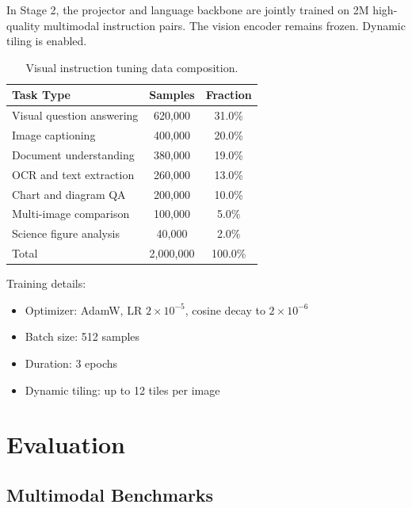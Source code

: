 \documentclass[11pt,a4paper]{article}
\begin{document}
In Stage 2, the projector and language backbone are jointly trained on 2M high-quality
multimodal instruction pairs. The vision encoder remains frozen. Dynamic tiling is enabled.

\begin{table}[H]
\centering
\caption{Visual instruction tuning data composition.}
\label{tab:sft_data}
\begin{tabular}{lcc}
\toprule
\textbf{Task Type} & \textbf{Samples} & \textbf{Fraction} \\
\midrule
Visual question answering  & 620{,}000 & 31.0\% \\
Image captioning           & 400{,}000 & 20.0\% \\
Document understanding     & 380{,}000 & 19.0\% \\
OCR and text extraction    & 260{,}000 & 13.0\% \\
Chart and diagram QA       & 200{,}000 & 10.0\% \\
Multi-image comparison     & 100{,}000 &  5.0\% \\
Science figure analysis    &  40{,}000 &  2.0\% \\
\midrule
Total                      & 2{,}000{,}000 & 100.0\% \\
\bottomrule
\end{tabular}
\end{table}

Training details:
\begin{itemize}
  \item Optimizer: AdamW, LR $2 \times 10^{-5}$, cosine decay to $2 \times 10^{-6}$
  \item Batch size: 512 samples
  \item Duration: 3 epochs
  \item Dynamic tiling: up to 12 tiles per image
\end{itemize}

\section{Evaluation}

\subsection{Multimodal Benchmarks}
\end{document}
